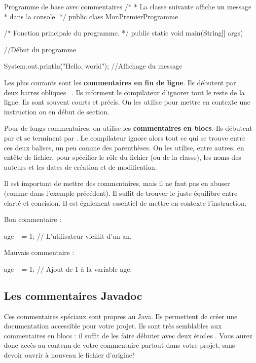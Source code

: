 \documentclass[12pt]{report}
\newcommand{\commande}[1]{%
\tcbox[on line, size=fbox, colframe=black, boxrule=0.75pt, tcbox raise base]{#1} %
}
\begin{document}
%
%
\begin{MyTCB}{Programme de base avec commentaires}
/* 
 * La classe suivante affiche un message
 * dans la console.
 */
public class MonPremierProgramme {

	/*  Fonction principale
		du programme.		*/
	public static void main(String[] args) {
	
		//Début du programme
		
		System.out.println("Hello, world"); //Affichage du message
		
	}
	
}
\end{MyTCB}
%
%
Les plus courants sont les \textbf{commentaires en fin de ligne}. Ils débutent par deux barres obliques \mbox{\commande{//}.} Ils informent le compilateur d'ignorer tout le reste de la ligne. Ils sont souvent courts et précis. On les utilise pour mettre en contexte une instruction ou en début de section.

Pour de longs commentaires, on utilise les \textbf{commentaires en blocs}. Ils débutent par \commande{/*} et se terminent par \commande{*/}. Le compilateur ignore alors tout ce qui se trouve entre ces deux balises, un peu comme des parenthèses. On les utilise, entre autres, en entête de fichier, pour spécifier le rôle du fichier (ou de la classe), les noms des auteurs et les dates de création et de modification.

Il est important de mettre des commentaires, mais il ne faut pas en abuser (comme dans l'exemple précédent). Il suffit de trouver le juste équilibre entre clarté et concision. Il est également essentiel de mettre en contexte l'instruction.

Bon commentaire :
\begin{code}
age += 1; // L'utilisateur vieillit d'un an.
\end{code}

Mauvais commentaire :
\begin{code}
age += 1; // Ajout de 1 à la variable age.
\end{code}


%
\subsection{Les commentaires Javadoc}
%
%
Ces commentaires spéciaux sont propres au Java. Ils permettent de créer une documentation accessible pour votre projet. Ils sont très semblables aux commentaires en blocs : il suffit de les faire débuter avec deux étoiles \commande{/**}. Vous aurez donc accès au contenu de votre commentaire partout dans votre projet, sans devoir ouvrir à nouveau le fichier d'origine! 
\end{document}
